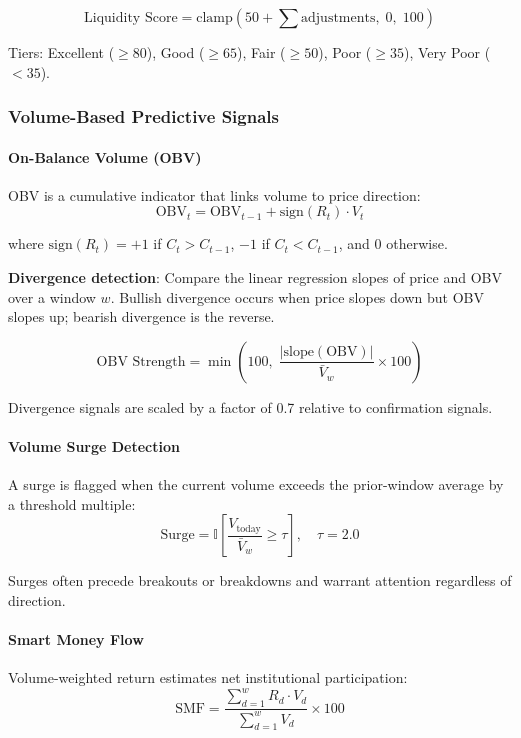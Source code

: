 \[
\text{Liquidity Score} = \text{clamp}\left( 50 + \sum \text{adjustments}, \; 0, \; 100 \right)
\]

Tiers: Excellent ($\geq 80$), Good ($\geq 65$), Fair ($\geq 50$), Poor ($\geq 35$), Very Poor ($< 35$).

\subsubsection{Volume-Based Predictive Signals}

\paragraph{On-Balance Volume (OBV)}

OBV is a cumulative indicator that links volume to price direction:
\[
\text{OBV}_t = \text{OBV}_{t-1} + \text{sign}(R_t) \cdot V_t
\]

where $\text{sign}(R_t) = +1$ if $C_t > C_{t-1}$, $-1$ if $C_t < C_{t-1}$, and $0$ otherwise.

\textbf{Divergence detection}: Compare the linear regression slopes of price and OBV over a window $w$. Bullish divergence occurs when price slopes down but OBV slopes up; bearish divergence is the reverse.

\[
\text{OBV Strength} = \min\left(100, \; \frac{|\text{slope}(\text{OBV})|} {\bar{V}_w} \times 100\right)
\]

Divergence signals are scaled by a factor of 0.7 relative to confirmation signals.

\paragraph{Volume Surge Detection}

A surge is flagged when the current volume exceeds the prior-window average by a threshold multiple:
\[
\text{Surge} = \mathbb{I}\!\left[ \frac{V_{\text{today}}}{\bar{V}_w} \geq \tau \right], \quad \tau = 2.0
\]

Surges often precede breakouts or breakdowns and warrant attention regardless of direction.

\paragraph{Smart Money Flow}

Volume-weighted return estimates net institutional participation:
\[
\text{SMF} = \frac{\sum_{d=1}^{w} R_d \cdot V_d}{\sum_{d=1}^{w} V_d} \times 100
\]

